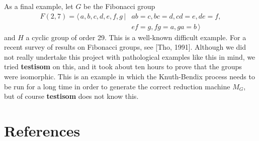 As a final example, let $G$ be the Fibonacci group
\begin{eqnarray*}
F(2,7)  =  \langle \, a,b,c,d,e,f,g \, | &  ab=c, bc=d, cd=e, de=f, \\
 & ef=g, fg=a, ga=b \, \rangle
\end{eqnarray*}
and $H$ a cyclic group of order 29. This is a well-known difficult example.
For a recent survey of results on Fibonacci groups, see [Tho, 1991].
Although we did not really undertake
this project with pathological examples like this in mind, we tried
{\bf testisom} on this, and it took about ten hours to prove that the
groups were isomorphic. This is an example in which the Knuth-Bendix process
needs to be run for a long time in order to generate the correct
reduction machine $M_G$, but of course {\bf testisom} does not know this.
\section{References}

